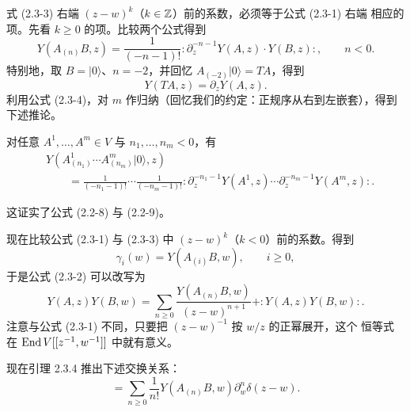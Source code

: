 式 (2.3-3) 右端 $(z-w)^k$（$k\in\mathbb{Z}$）前的系数，必须等于公式 (2.3-1) 右端
相应的项。先看 $k\ge0$ 的项。比较两个公式得到
\begin{equation}
    Y(A_{(n)}B,z)=\frac{1}{(-n-1)!}
    :\!\partial_z^{-n-1}Y(A,z)\cdot Y(B,z)\!:,
    \qquad n<0.
    \tag{2.3-4}
\end{equation}
特别地，取 $B=|0\rangle$、$n=-2$，并回忆 $A_{(-2)}|0\rangle=TA$，得到
\begin{equation}
    Y(TA,z)=\partial_zY(A,z).
    \tag{2.3-5}
\end{equation}
利用公式 (2.3-4)，对 $m$ 作归纳（回忆我们的约定：正规序从右到左嵌套），得到
下述推论。

\renewcommand{\thecorollary}{2.3.3}
\begin{corollary}
    对任意 $A^1,\dots,A^m\in V$ 与 $n_1,\dots,n_m<0$，有
    \[
        \begin{aligned}
            &Y(A^1_{(n_1)}\cdots A^m_{(n_m)}|0\rangle,z)\\
            &\qquad=\frac{1}{(-n_1-1)!}\cdots\frac{1}{(-n_m-1)!}
            :\!\partial_z^{-n_1-1}Y(A^1,z)\cdots
            \partial_z^{-n_m-1}Y(A^m,z)\!:.
        \end{aligned}
    \]
\end{corollary}

这证实了公式 (2.2-8) 与 (2.2-9)。

现在比较公式 (2.3-1) 与 (2.3-3) 中 $(z-w)^k$（$k<0$）前的系数。得到
\[
    \gamma_i(w)=Y(A_{(i)}B,w),\qquad i\ge0,
\]
于是公式 (2.3-2) 可以改写为
\begin{equation}
    Y(A,z)Y(B,w)=\sum_{n\ge0}\frac{Y(A_{(n)}B,w)}{(z-w)^{n+1}}
    +:\!Y(A,z)Y(B,w)\!:.
    \tag{2.3-6}
\end{equation}
注意与公式 (2.3-1) 不同，只要把 $(z-w)^{-1}$ 按 $w/z$ 的正幂展开，这个
恒等式在 $\operatorname{End} V[[z^{-1},w^{-1}]]$ 中就有意义。

现在引理 2.3.4 推出下述交换关系：
\begin{equation}
    [Y(A,z),Y(B,w)]=\sum_{n\ge0}\frac{1}{n!}
    Y(A_{(n)}B,w)\partial_w^n\delta(z-w).
    \tag{2.3-7}
\end{equation}

